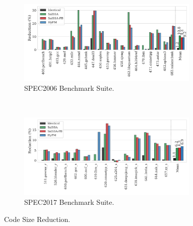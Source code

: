 \begin{figure}[h]
  \centering
  \begin{subfigure}{\textwidth}
    \centering
    \includegraphics[width=0.95\textwidth]{src/fastfm/figs/code-size-spec2006.pdf}
    \caption{SPEC2006 Benchmark Suite.}
    \label{fig:code-size-spec2006}
  \end{subfigure}
  \\
  \begin{subfigure}{\textwidth}
  \centering
    \includegraphics[width=0.95\textwidth]{src/fastfm/figs/code-size-spec2017.pdf}
    \caption{SPEC2017 Benchmark Suite.}
    \label{fig:code-size-spec2017}
  \end{subfigure}
  \caption{Code Size Reduction.}
  \label{fig:code-size-reduction}
\end{figure}

